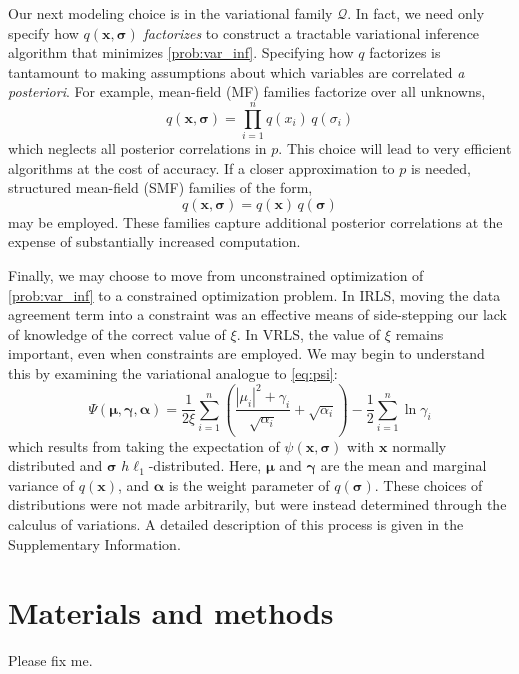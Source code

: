 \documentclass[final,5p,times,twocolumn]{elsarticle}
\newcommand{\m}[1]{\boldsymbol{#1}}
\begin{document}
Our next modeling choice is in the variational family $\mathcal{Q}$. In
fact, we need only specify how $q(\m{x}, \m{\sigma})$ \emph{factorizes}
to construct a tractable variational inference algorithm that minimizes
\eqref{prob:var_inf}. Specifying how $q$ factorizes is tantamount to
making assumptions about which variables are correlated
\emph{a posteriori}. For example, mean-field (MF) families factorize
over all unknowns,
\begin{equation}
q(\m{x}, \m{\sigma}) =
 {\textstyle\prod}_{i=1}^n q(x_i) \, q(\sigma_i)
\label{eq:example_mf}
\end{equation}
which neglects all posterior correlations in $p$. This choice will lead
to very efficient algorithms at the cost of accuracy. If a closer
approximation to $p$ is needed, structured mean-field (SMF) families
of the form,
\begin{equation}
q(\m{x}, \m{\sigma}) = q(\m{x}) \, q(\m{\sigma})
\label{eq:example_smf}
\end{equation}
may be employed. These families capture additional posterior correlations
at the expense of substantially increased computation.

Finally, we may choose to move from unconstrained optimization of
\eqref{prob:var_inf} to a constrained optimization problem. In IRLS,
moving the data agreement term into a constraint was an effective means
of side-stepping our lack of knowledge of the correct value of $\xi$.
In VRLS, the value of $\xi$ remains important, even when constraints
are employed. We may begin to understand this by examining the variational
analogue to \eqref{eq:psi}:
\begin{equation}
\Psi(\m{\mu}, \m{\gamma}, \m{\alpha}) =
 \frac{1}{2 \xi} \sum_{i=1}^n \left(
  \frac{|\mu_i|^2 + \gamma_i}{\sqrt{\alpha_i}} + \sqrt{\alpha_i}
 \right)
 -\frac{1}{2} \sum_{i=1}^n \ln \gamma_i
\label{eq:psibar}
\end{equation}
which results from taking the expectation of $\psi(\m{x}, \m{\sigma})$
with $\m{x}$ normally distributed and $\m{\sigma}$ $h\ell_1$-distributed.
Here, $\m{\mu}$ and $\m{\gamma}$ are the mean and marginal variance of
$q(\m{x})$, and $\m{\alpha}$ is the weight parameter of $q(\m{\sigma})$.
These choices of distributions were not made arbitrarily, but were
instead determined through the calculus of variations. A detailed
description of this process is given in the Supplementary Information.

\section{Materials and methods}
\label{s:methods}
Please fix me.
\end{document}
